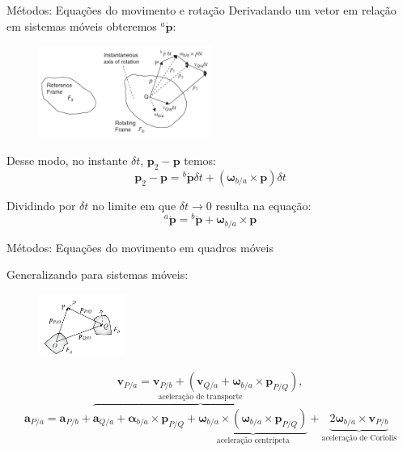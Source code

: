 \documentclass{beamer}
\begin{document}
\begin{frame}{Métodos: Equações do movimento e rotação}
Derivadando um vetor em relação em sistemas móveis obteremos \(^{a}\dot{\mathbf{p}}\):

\begin{figure}[H]
    \centering
    \includegraphics[width=0.5\textwidth, keepaspectratio]{figuras/figure1.4-1.png}\label{fig1.4-1}
\end{figure}

Desse modo, no instante \(\delta t\), \(\mathbf{p}_{2} \!-\! \mathbf{p}\) temos:
\begin{equation*}
    \mathbf{p}_{2} - \mathbf{p} = {^{b}\dot{\mathbf{p}}} \delta t + \left( \mathbf{\omega}_{b/a} \! \times \!\mathbf{p} \right) \delta t
\end{equation*}

Dividindo por \(\delta t\) no limite em que \(\delta t \rightarrow 0\) resulta na equação\footnotemark{}:
\begin{equation} \label{eq:1.4-2}
    {^{a}\dot{\mathbf{p}}} = {^{b}\dot{\mathbf{p}}} + {\mathbf{\omega}_{b/a} \! \times \!\mathbf{p}}
\end{equation}
\end{frame}

\begin{frame}{Métodos: Equações do movimento em quadros móveis}

Generalizando para sistemas móveis:

\begin{figure}[H]
    \centering
    \includegraphics[width=0.25\textwidth, keepaspectratio]{figuras/figure1.5-1.png}\label{fig1.5-1}
\end{figure}

\begin{equation*}
    \mathbf{v}_{P/a} = \mathbf{v}_{P/b} + \left( \mathbf{v}_{Q/a} + \mathbf{\omega}_{b/a}\!\times\!\mathbf{p}_{P/Q} \right),
\end{equation*}
\begin{equation*}
    \mathbf{a}_{P/a} = \mathbf{a}_{P/b} + \overbrace{\mathbf{a}_{Q/a} + {{\mathbf{\alpha}_{b/a}}\!\times\!{\mathbf{p}_{P/Q}}} + \underbrace{{{\mathbf{\omega}_{b/a}}\!\times\!{\left({\mathbf{\omega}_{b/a}}\!\times\!{\mathbf{p}_{P/Q}}\right)}}}_{\text{aceleração centrípeta}}}^{\text{aceleração de transporte}} + \underbrace{{2\mathbf{\omega}_{b/a}\!\times\!\mathbf{v}_{P/b}}}_{\text{aceleração de Coriolis}} \label{eq:1.5-4}
\end{equation*}

\end{frame}
\end{document}
